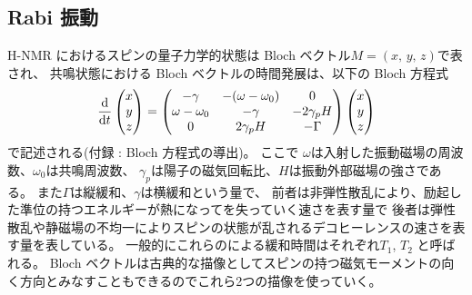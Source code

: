 \documentclass[11pt,dvipdfmx,a4paper]{jsarticle}
\begin{document}
\subsection{Rabi 振動}
H-NMR におけるスピンの量子力学的状態は Bloch ベクトル\(M = (x,\,y,\,z)\)で表され、
共鳴状態における Bloch ベクトルの時間発展は、以下の Bloch 方程式
\begin{equation}
	\dv{t}
	\begin{pmatrix}
		x\\ y\\ z
	\end{pmatrix}
	=
	\begin{pmatrix}
		-\gamma & -(\omega-\omega_0) & 0\\
		\omega -\omega_0 & -\gamma & -2\gamma_p H\\
		0 & 2\gamma_p H & -\Gamma
	\end{pmatrix}
	\begin{pmatrix}
		x\\ y\\ z
	\end{pmatrix}
\end{equation}
で記述される(付録 : Bloch 方程式の導出)。
ここで
\(\omega\)は入射した振動磁場の周波数、\(\omega_0\)は共鳴周波数、
\(\gamma_p\)は陽子の磁気回転比、\(H\)は振動外部磁場の強さである。
また\(\Gamma\)は縦緩和、\(\gamma\)は横緩和という量で、
前者は非弾性散乱により、励起した準位の持つエネルギーが熱になってを失っていく速さを表す量で
後者は弾性散乱や静磁場の不均一によりスピンの状態が乱されるデコヒーレンスの速さを表す量を表している。
一般的にこれらのによる緩和時間はそれぞれ\(T_1\), \(T_2\) と呼ばれる。
Bloch ベクトルは古典的な描像としてスピンの持つ磁気モーメントの向く方向とみなすこともできるのでこれら2つの描像を使っていく。
\end{document}
